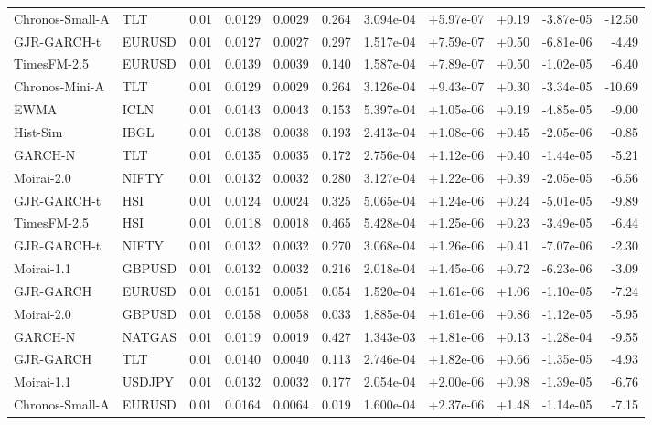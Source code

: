 \begin{tabular}{llrrrrrrrrr}
Chronos-Small-A & TLT & 0.01 & 0.0129 & 0.0029 & 0.264 & 3.094e-04 & +5.97e-07 & +0.19 & -3.87e-05 & -12.50 \\
GJR-GARCH-t & EURUSD & 0.01 & 0.0127 & 0.0027 & 0.297 & 1.517e-04 & +7.59e-07 & +0.50 & -6.81e-06 & -4.49 \\
TimesFM-2.5 & EURUSD & 0.01 & 0.0139 & 0.0039 & 0.140 & 1.587e-04 & +7.89e-07 & +0.50 & -1.02e-05 & -6.40 \\
Chronos-Mini-A & TLT & 0.01 & 0.0129 & 0.0029 & 0.264 & 3.126e-04 & +9.43e-07 & +0.30 & -3.34e-05 & -10.69 \\
EWMA & ICLN & 0.01 & 0.0143 & 0.0043 & 0.153 & 5.397e-04 & +1.05e-06 & +0.19 & -4.85e-05 & -9.00 \\
Hist-Sim & IBGL & 0.01 & 0.0138 & 0.0038 & 0.193 & 2.413e-04 & +1.08e-06 & +0.45 & -2.05e-06 & -0.85 \\
GARCH-N & TLT & 0.01 & 0.0135 & 0.0035 & 0.172 & 2.756e-04 & +1.12e-06 & +0.40 & -1.44e-05 & -5.21 \\
Moirai-2.0 & NIFTY & 0.01 & 0.0132 & 0.0032 & 0.280 & 3.127e-04 & +1.22e-06 & +0.39 & -2.05e-05 & -6.56 \\
GJR-GARCH-t & HSI & 0.01 & 0.0124 & 0.0024 & 0.325 & 5.065e-04 & +1.24e-06 & +0.24 & -5.01e-05 & -9.89 \\
TimesFM-2.5 & HSI & 0.01 & 0.0118 & 0.0018 & 0.465 & 5.428e-04 & +1.25e-06 & +0.23 & -3.49e-05 & -6.44 \\
GJR-GARCH-t & NIFTY & 0.01 & 0.0132 & 0.0032 & 0.270 & 3.068e-04 & +1.26e-06 & +0.41 & -7.07e-06 & -2.30 \\
Moirai-1.1 & GBPUSD & 0.01 & 0.0132 & 0.0032 & 0.216 & 2.018e-04 & +1.45e-06 & +0.72 & -6.23e-06 & -3.09 \\
GJR-GARCH & EURUSD & 0.01 & 0.0151 & 0.0051 & 0.054 & 1.520e-04 & +1.61e-06 & +1.06 & -1.10e-05 & -7.24 \\
Moirai-2.0 & GBPUSD & 0.01 & 0.0158 & 0.0058 & 0.033 & 1.885e-04 & +1.61e-06 & +0.86 & -1.12e-05 & -5.95 \\
GARCH-N & NATGAS & 0.01 & 0.0119 & 0.0019 & 0.427 & 1.343e-03 & +1.81e-06 & +0.13 & -1.28e-04 & -9.55 \\
GJR-GARCH & TLT & 0.01 & 0.0140 & 0.0040 & 0.113 & 2.746e-04 & +1.82e-06 & +0.66 & -1.35e-05 & -4.93 \\
Moirai-1.1 & USDJPY & 0.01 & 0.0132 & 0.0032 & 0.177 & 2.054e-04 & +2.00e-06 & +0.98 & -1.39e-05 & -6.76 \\
Chronos-Small-A & EURUSD & 0.01 & 0.0164 & 0.0064 & 0.019 & 1.600e-04 & +2.37e-06 & +1.48 & -1.14e-05 & -7.15 \\

\end{tabular}
